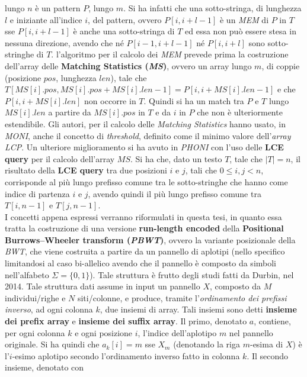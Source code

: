 \documentclass[a4paper,11pt, oneside]{article}
\begin{document}
lungo $n$ è un pattern $P$, lungo $m$. Si ha infatti che una sotto-stringa, di
lunghezza $l$ e iniziante all'indice $i$, del pattern, ovvero $P[i,i+l-1]$ è un
\textit{MEM} di $P$ in $T$ 
sse $P[i,i+l-1]$ è anche una sotto-stringa di $T$ ed essa non può essere stesa
in nessuna direzione, avendo che né $P[i-1,i+l-1]$ né $P[i,i+l]$ sono
sotto-stringhe di $T$. l'algoritmo per il calcolo dei \textit{MEM} prevede prima
la costruzione dell'array delle \textbf{Matching Statistics (\textit{MS})},
ovvero un array lungo $m$, di coppie (posizione $pos$, lunghezza $len$), tale
che 
$T[MS[i].pos,MS[i].pos+MS[i].len-1]=P[i,i+MS[i].len-1]$ e che $P[i,i+MS[i].len]$
non occorre in $T$. Quindi si ha un match tra $P$ e $T$ lungo $MS[i].len$ a
partire da $MS[i].pos$ in $T$ e da $i$ in $P$ che non è ulteriormente
estendibile. Gli autori, per il calcolo delle \textit{Matching Statistics} hanno
usato, in \textit{MONI}, anche il concetto di \textit{threshold}, definito come
il minimo valore dell'\textit{array LCP}. Un
ulteriore miglioramento si ha avuto in \textit{PHONI} con l'uso delle
\textbf{LCE query} per il calcolo dell'array $MS$. Si ha che, dato un testo $T$,
tale che $|T|=n$, il risultato della \textbf{LCE query} tra 
due posizioni $i$ e $j$, tali che $0\leq i,j<n$, corrisponde al più lungo
prefisso comune tra le sotto-stringhe che hanno come indice di partenza $i$ e
$j$, avendo quindi il più lungo prefisso comune tra $T[i,n-1]$ e
$T[j,n-1]$.\\
I concetti appena espressi verranno riformulati in questa tesi, in quanto essa
tratta la costruzione di una versione \textbf{run-length encoded} della
\textbf{Positional Burrows–Wheeler transform (\textit{PBWT})}, ovvero la
variante posizionale della \textit{BWT}, che viene costruita a partire da un
pannello di aplotipi (nello specifico limitandosi al caso bi-allelico avendo che
il pannello è composto da simboli nell'alfabeto $\Sigma=\{0,1\}$). Tale
struttura è frutto degli studi fatti da Durbin, nel 2014. Tale struttura dati
assume in input un pannello $X$, composto da $M$ individui/righe e $N$
siti/colonne, e produce, tramite l'\textit{ordinamento dei prefissi inverso}, ad
ogni colonna $k$, due insiemi di array. Tali insiemi sono detti \textbf{insieme
  dei prefix array} e \textbf{insieme dei suffix array}. Il primo, denotato $a$,
contiene, per ogni colonna $k$ e ogni posizione $i$, l'indice dell'aplotipo $m$
nel pannello originale. Si ha quindi che $a_k[i]=m$ sse $X_m$ 
(denotando la riga $m$-esima di $X$) è l'$i$-esimo aplotipo secondo
l'ordinamento inverso fatto in colonna $k$. Il secondo insieme, denotato con
\end{document}
